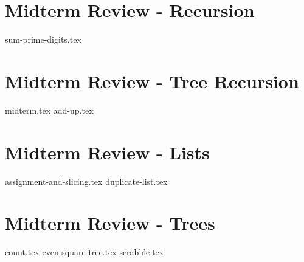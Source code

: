 \documentclass{exam}
\begin{document}
\section{Midterm Review - Recursion}
\begin{questions}
{sum-prime-digits.tex}
\end{questions}

\section{Midterm Review - Tree Recursion}
\begin{questions}
{midterm.tex}
{add-up.tex}
\end{questions}

\newpage
\section{Midterm Review - Lists}
\begin{questions}
{assignment-and-slicing.tex}
{duplicate-list.tex}
\end{questions}

\newpage
\section{Midterm Review - Trees}
\begin{questions}
{count.tex}
{even-square-tree.tex}
{scrabble.tex}
\end{questions}
\end{document}
